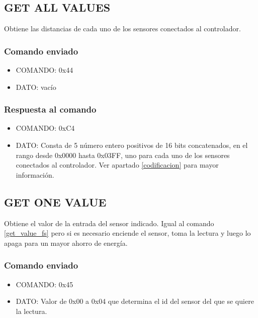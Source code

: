 \documentclass[a4paper,10pt]{article}
\begin{document}
\subsection{GET ALL VALUES}
\label{get_all_values_fs}

Obtiene las distancias de cada uno de los sensores conectados al controlador.

\subsubsection*{Comando enviado}

\begin{itemize}
	\item{COMANDO:} 0x44
	\item{DATO:} vac\'io
\end{itemize}

\subsubsection*{Respuesta al comando}

\begin{itemize}
	\item{COMANDO:} 0xC4
	\item{DATO:} Consta de 5 n\'umero entero positivos de 16 bits concatenados, en el rango desde 0x0000 hasta 0x03FF,
		uno para cada uno de los sensores conectados al controlador.
		Ver apartado \ref{codificacion} para mayor informaci\'on.
\end{itemize}

\subsection{GET ONE VALUE}
\label{get_one_value_fs}

Obtiene el valor de la entrada del sensor indicado.
Igual al comando \ref{get_value_fs} pero si es necesario enciende el sensor, toma la lectura y luego lo apaga para un mayor ahorro de energ\'ia.

\subsubsection*{Comando enviado}

\begin{itemize}
	\item{COMANDO:} 0x45
	\item{DATO:} Valor de 0x00 a 0x04 que determina el id del sensor del que se quiere la lectura.
\end{itemize}
\end{document}
